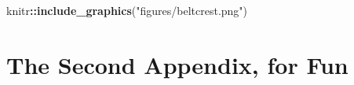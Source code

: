 \documentclass[a4paper, twoside]{templates/ociamthesis}
\newenvironment{Shaded}{\begin{snugshade}}{\end{snugshade}}
\newcommand{\KeywordTok}[1]{\textcolor[rgb]{0.13,0.29,0.53}{\textbf{#1}}}
\newcommand{\NormalTok}[1]{#1}
\newcommand{\OperatorTok}[1]{\textcolor[rgb]{0.81,0.36,0.00}{\textbf{#1}}}
\newcommand{\StringTok}[1]{\textcolor[rgb]{0.31,0.60,0.02}{#1}}
\renewenvironment{Shaded}
{
  \vspace{4pt}%
  \begin{snugshade}%
}{%
  \end{snugshade}%
  \vspace{4pt}%
}
\newcommand*{\bibtitle}{References}
\begin{document}
\begin{Shaded}
\begin{Highlighting}[]
\NormalTok{knitr}\OperatorTok{::}\KeywordTok{include_graphics}\NormalTok{(}\StringTok{"figures/beltcrest.png"}\NormalTok{)}
\end{Highlighting}
\end{Shaded}

\hypertarget{the-second-appendix-for-fun}{%
\chapter{The Second Appendix, for Fun}\label{the-second-appendix-for-fun}}




\setlength{\baselineskip}{0pt} %

{\renewcommand*\MakeUppercase[1]{#1}%
\printbibliography[heading=bibintoc,title={\bibtitle}]}
\end{document}
